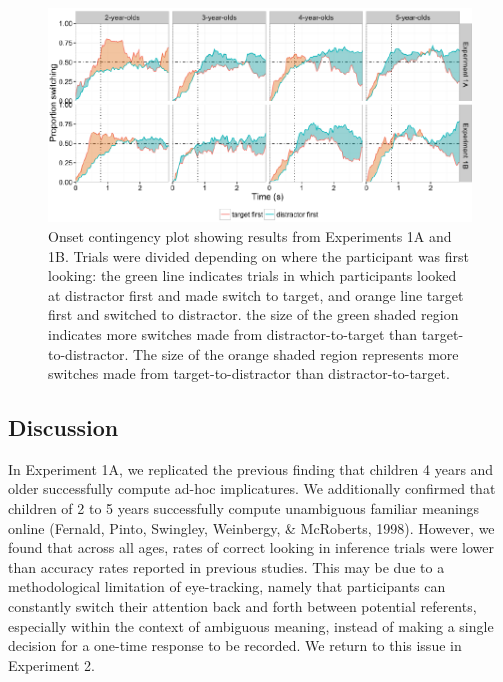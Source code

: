 \documentclass[a4paper,man,apacite,floatsintext]{apa6}
\newenvironment{CodeChunk}{}{}
\begin{document}
\begin{CodeChunk}
\begin{figure}[H]

{\centering \includegraphics{figs/et_onset1-1} 

}

\caption[Onset contingency plot showing results from Experiments 1A and 1B]{Onset contingency plot showing results from Experiments 1A and 1B. Trials were divided depending on where the participant was first looking: the green line indicates trials in which participants looked at distractor first and made switch to target, and orange line target first and switched to distractor. the size of the green shaded region indicates more switches made from distractor-to-target than target-to-distractor. The size of the orange shaded region represents more switches made from target-to-distractor than distractor-to-target.}\label{fig:et_onset1}
\end{figure}
\end{CodeChunk}

\subsection{Discussion}\label{discussion}

In Experiment 1A, we replicated the previous finding that children 4
years and older successfully compute ad-hoc implicatures. We
additionally confirmed that children of 2 to 5 years successfully
compute unambiguous familiar meanings online (Fernald, Pinto, Swingley,
Weinbergy, \& McRoberts, 1998). However, we found that across all ages,
rates of correct looking in inference trials were lower than accuracy
rates reported in previous studies. This may be due to a methodological
limitation of eye-tracking, namely that participants can constantly
switch their attention back and forth between potential referents,
especially within the context of ambiguous meaning, instead of making a
single decision for a one-time response to be recorded. We return to
this issue in Experiment 2.
\end{document}
